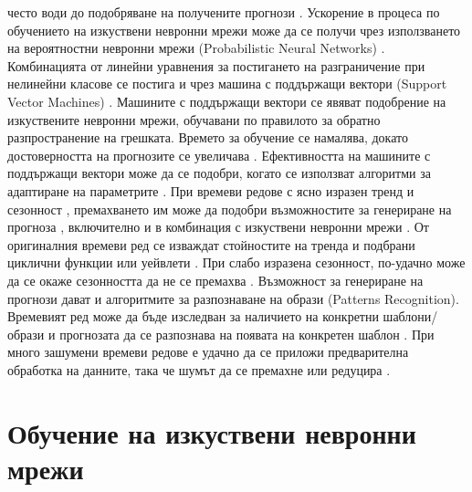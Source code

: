 често води до подобряване на получените прогнози \cite{Cao-02}. Ускорение в процеса по обучението на изкуствени невронни мрежи може да се получи чрез използването на вероятностни невронни мрежи (Probabilistic Neural Networks) \cite{Khashei-02}. Комбинацията от линейни уравнения за постигането на разграничение при нелинейни класове се постига и чрез машина с поддържащи вектори (Support Vector Machines) \cite{Kyoung-jae-01}. Машините с поддържащи вектори се явяват подобрение на изкуствените невронни мрежи, обучавани по правилото за обратно разпространение на грешката. Времето за обучение се намалява, докато достоверността на прогнозите се увеличава \cite{Tay-01}. Ефективността на машините с поддържащи вектори може да се подобри, когато се използват алгоритми за адаптиране на параметрите \cite{Cao-01}. При времеви редове с ясно изразен тренд и сезонност \cite{Zhang-04}, премахването им може да подобри възможностите за генериране на прогноза \cite{Zhang-02}, включително и в комбинация с изкуствени невронни мрежи \cite{Jain-01}. От оригиналния времеви ред се изваждат стойностите на тренда и подбрани циклични функции \cite{Nelson-01} или уейвлети \cite{Joo-01}. При слабо изразена сезонност, по-удачно може да се окаже сезонността да не се премахва \cite{Hamzacebi-01}. Възможност за генериране на прогнози дават и алгоритмите за разпознаване на образи (Patterns Recognition). Времевият ред може да бъде изследван за наличието на конкретни шаблони/образи и прогнозата да се разпознава на появата на конкретен шаблон \cite{Singh-01}. При много зашумени времеви редове е удачно да се приложи предварителна обработка на данните, така че шумът да се премахне или редуцира \cite{Lu-01}.

\section{Обучение на изкуствени невронни мрежи}


